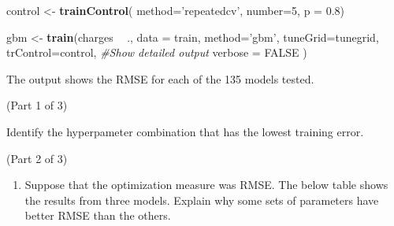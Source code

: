 \documentclass[openany]{book}
\newenvironment{Shaded}{\begin{snugshade}}{\end{snugshade}}
\newcommand{\CommentTok}[1]{\textcolor[rgb]{0.56,0.35,0.01}{\textit{#1}}}
\newcommand{\DataTypeTok}[1]{\textcolor[rgb]{0.13,0.29,0.53}{#1}}
\newcommand{\DecValTok}[1]{\textcolor[rgb]{0.00,0.00,0.81}{#1}}
\newcommand{\FloatTok}[1]{\textcolor[rgb]{0.00,0.00,0.81}{#1}}
\newcommand{\KeywordTok}[1]{\textcolor[rgb]{0.13,0.29,0.53}{\textbf{#1}}}
\newcommand{\NormalTok}[1]{#1}
\newcommand{\OperatorTok}[1]{\textcolor[rgb]{0.81,0.36,0.00}{\textbf{#1}}}
\newcommand{\OtherTok}[1]{\textcolor[rgb]{0.56,0.35,0.01}{#1}}
\newcommand{\StringTok}[1]{\textcolor[rgb]{0.31,0.60,0.02}{#1}}
\providecommand{\tightlist}{%
  \setlength{\itemsep}{0pt}\setlength{\parskip}{0pt}}
\begin{document}
\begin{Shaded}
\begin{Highlighting}[]
\NormalTok{control <-}\StringTok{ }\KeywordTok{trainControl}\NormalTok{(}
  \DataTypeTok{method=}\StringTok{'repeatedcv'}\NormalTok{, }
  \DataTypeTok{number=}\DecValTok{5}\NormalTok{, }
  \DataTypeTok{p =} \FloatTok{0.8}\NormalTok{)}
\end{Highlighting}
\end{Shaded}

\begin{Shaded}
\begin{Highlighting}[]
\NormalTok{gbm <-}\StringTok{ }\KeywordTok{train}\NormalTok{(charges }\OperatorTok{~}\StringTok{ }\NormalTok{.,}
            \DataTypeTok{data =}\NormalTok{ train,}
            \DataTypeTok{method=}\StringTok{'gbm'}\NormalTok{, }
            \DataTypeTok{tuneGrid=}\NormalTok{tunegrid, }
            \DataTypeTok{trControl=}\NormalTok{control,}
            \CommentTok{#Show detailed output}
            \DataTypeTok{verbose =} \OtherTok{FALSE}
\NormalTok{            )}
\end{Highlighting}
\end{Shaded}

The output shows the RMSE for each of the 135 models tested.

(Part 1 of 3)

Identify the hyperpameter combination that has the lowest training error.

(Part 2 of 3)

\begin{enumerate}
\def\labelenumi{\arabic{enumi}.}
\setcounter{enumi}{1}
\tightlist
\item
  Suppose that the optimization measure was RMSE. The below table shows the results from three models. Explain why some sets of parameters have better RMSE than the others.
\end{enumerate}
\end{document}
